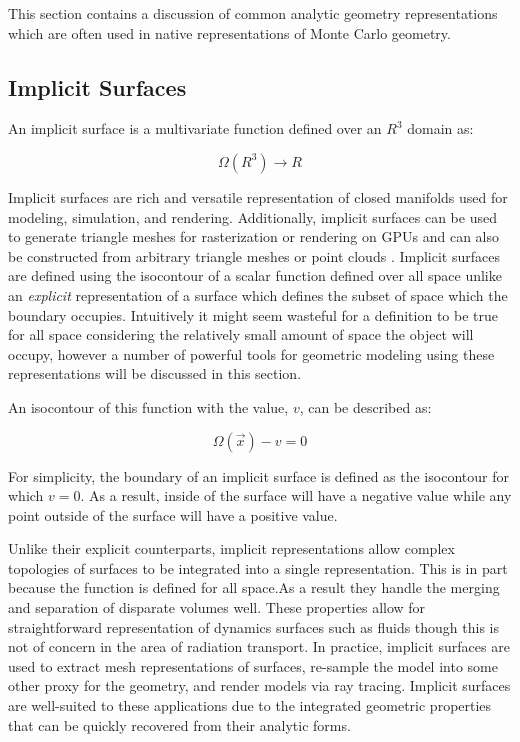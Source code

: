 This section contains a discussion of common analytic geometry  representations
which are often used in native representations of Monte Carlo geometry.

\subsection{Implicit Surfaces}\label{subsec:implicit_surfaces}

An implicit surface is a multivariate function defined over an $ R^3 $ domain as:

\begin{equation}
    \Omega(R^3)\rightarrow R
\end{equation}

Implicit surfaces are rich and versatile representation of closed manifolds used
for modeling, simulation, and rendering. Additionally, implicit surfaces can be
used to generate triangle meshes for rasterization or rendering on GPUs
\cite{Sethian_1996} and can also be constructed from arbitrary triangle meshes
or point clouds \cite{Sigg_2006}. Implicit surfaces are defined using the
isocontour of a scalar function defined over all space unlike an
\textit{explicit} representation of a surface which defines the subset of space
which the boundary occupies. Intuitively it might seem wasteful for a definition
to be true for all space considering the relatively small amount of space the
object will occupy, however a number of powerful tools for geometric modeling
using these representations will be discussed in this section.

An isocontour of this function with the value, $v$, can be described as:

\begin{equation}
  \Omega(\vec{x}) - v  = 0 
\end{equation}

For simplicity, the boundary of an implicit surface is defined as the isocontour
for which $v=0$. As a result, inside of the surface will have a negative value
while any point outside of the surface will have a positive value.

Unlike their explicit counterparts, implicit representations allow complex
topologies of surfaces to be integrated into a single representation. This is in
part because the function is defined for all space.As a result they handle the
merging and separation of disparate volumes well. These properties allow for
straightforward representation of dynamics surfaces such as fluids though this
is not of concern in the area of radiation transport. In practice, implicit
surfaces are used to extract mesh representations of surfaces, re-sample the
model into some other proxy for the geometry, and render models via ray
tracing. Implicit surfaces are well-suited to these applications due to the
integrated geometric properties that can be quickly recovered from their
analytic forms.

